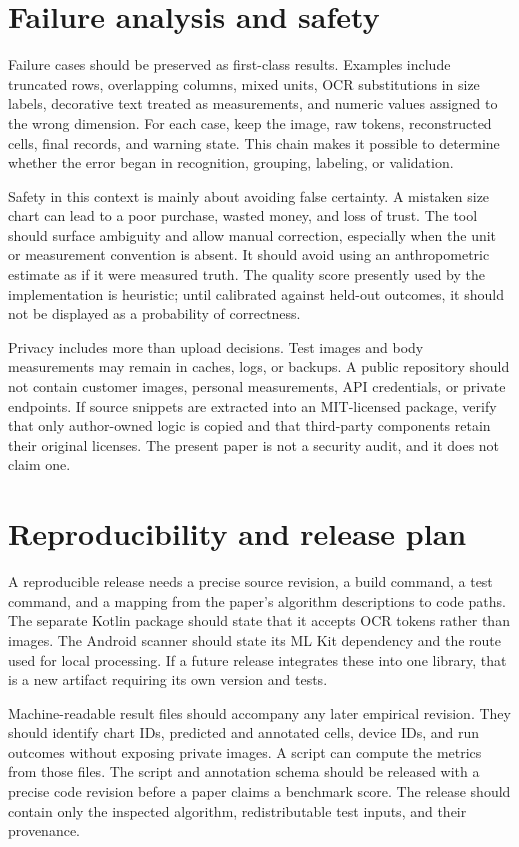 \documentclass[10pt,letterpaper]{article}
\begin{document}
\section{Failure analysis and safety}

Failure cases should be preserved as first-class results. Examples include truncated rows, overlapping columns, mixed units, OCR substitutions in size labels, decorative text treated as measurements, and numeric values assigned to the wrong dimension. For each case, keep the image, raw tokens, reconstructed cells, final records, and warning state. This chain makes it possible to determine whether the error began in recognition, grouping, labeling, or validation.

Safety in this context is mainly about avoiding false certainty. A mistaken size chart can lead to a poor purchase, wasted money, and loss of trust. The tool should surface ambiguity and allow manual correction, especially when the unit or measurement convention is absent. It should avoid using an anthropometric estimate as if it were measured truth. The quality score presently used by the implementation is heuristic; until calibrated against held-out outcomes, it should not be displayed as a probability of correctness.

Privacy includes more than upload decisions. Test images and body measurements may remain in caches, logs, or backups. A public repository should not contain customer images, personal measurements, API credentials, or private endpoints. If source snippets are extracted into an MIT-licensed package, verify that only author-owned logic is copied and that third-party components retain their original licenses. The present paper is not a security audit, and it does not claim one.

\section{Reproducibility and release plan}

A reproducible release needs a precise source revision, a build command, a test command, and a mapping from the paper's algorithm descriptions to code paths. The separate Kotlin package should state that it accepts OCR tokens rather than images. The Android scanner should state its ML Kit dependency and the route used for local processing. If a future release integrates these into one library, that is a new artifact requiring its own version and tests.

Machine-readable result files should accompany any later empirical revision. They should identify chart IDs, predicted and annotated cells, device IDs, and run outcomes without exposing private images. A script can compute the metrics from those files. The script and annotation schema should be released with a precise code revision before a paper claims a benchmark score. The release should contain only the inspected algorithm, redistributable test inputs, and their provenance.
\end{document}
